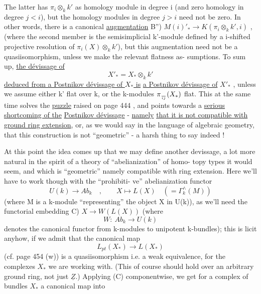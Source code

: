 
The latter has  $\pi_i\otimes_k k'$ as homology module in
degree i (and zero homology in degree $j<i$), but the homology modules
 
in degree $j>i$ need not be zero. In other words, there is a canonical
\uline{augmentation}
B'') \hfill {} $M(i)'_{*}\longrightarrow K(\pi_i\otimes_k k',i)$ \hfill ,
(where the second member is the semisimplicial  k'-module defined
by a i-shifted projective resolution of $\pi_i(X)\otimes_k k'$), but this augmentation
need not be a quasiisomorphism, unless we make the relevant flatness as-%
sumptions. To sum up, \uline{the dévissage of} 
\[ X'_{*} = X_{*}\otimes_k k' \]
\uline{deduced from a Postnikov dévissage of $X_{*}$ is}  \uline{a Postnikov dévissage of}
$X'_{*}$ , unless we assume either k' flat over k, or the k-modules $\pi_{\over{i}{j}}(X_{*})$
flat. This at the same time solves the \uline{puzzle} raised on page 444 , and
points towards a \uline{serious shortcoming of the}  \uline{Postnikov dévissage} - \uline{namely}
\uline{that it is not compatible with ground ring extension}, or, as we would
say in the language of algebraic geometry, that this construction is not
``geometric'' - a harsh thing to say indeed !

At this point the idea comes up that we may define another devissage,
a lot more natural in the spirit of a theory of ``abelianization'' of homo-%
topy types it would seem, and which is ``geometric'' namely compatible
with ring extension. Here we'll have to work though with the ``prohibiti-%
ve'' abelianization functor
\[ U(k)\longrightarrow Ab_k \quad , \qquad X\longmapsto L(X) \quad ( = \Gamma^{\wedge}_k(M) ) \]
(where M is a k-module ``representing'' the object X in U(k)), as 
we'll need the functorial embedding
 C) \hfill $X\longrightarrow W(L(X))$ \hfill
(where
\[ W:\ Ab_k\longrightarrow U(k) \]
denotes the canonical functor from k-modules to unipotent k-bundles);
this is licit anyhow, if we admit that  the canonical map
\[ L_{pt}(X_{*})\longrightarrow L(X_{*}) \]
(cf. page 454 (w)) is a quasiisomorphism i.e. a weak equivalence, for
the complexes $X_{*}$ we are working with. (This of course should hold over
an arbitrary ground ring, not just $\underline{Z}$.) Applying (C) componentwise, we
get for a complex of bundles $X_{*}$ a canonical map into   

